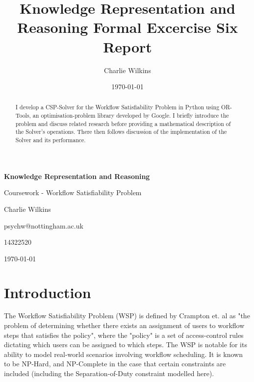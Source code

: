 \documentclass[11pt]{article}
\title{Knowledge Representation and Reasoning Formal Excercise Six Report}
\author{Charlie Wilkins}
\date{\today}
\begin{document}
	\begin{titlepage}
		\begin{center}
			\vspace*{1cm}

       		\textbf{Knowledge Representation and Reasoning}

       		\vspace{0.5cm}

			   Coursework - Workflow Satisfiability Problem

       		\vspace{1.5cm}

       		Charlie Wilkins
			
			\vspace{0.5cm}			
			
       		psychw@nottingham.ac.uk
       		
       		14322520
       		
       		\vspace{0.5cm}
       		
       		\today
		\end{center}
	\end{titlepage}

	\begin{abstract}

		I develop a CSP-Solver for the Workflow Satisfiability Problem in Python
		using OR-Tools, an optimisation-problem library developed by Google. I
		briefly introduce the problem and discuss related research before providing
		a mathematical description of the Solver's operations. There then follows
		discussion of the implementation of the Solver and its performance.

	\end{abstract}

	\newpage

	\tableofcontents

	\newpage

	\section{Introduction}

		The Workflow Satisfiability Problem (WSP) is defined by Crampton et. al\cite{crampton16} as
		"the problem of determining whether there exists an assignment of
		users to workflow steps that satisfies the policy", where the "policy"
		is a set of access-control rules dictating which users can be assigned
		to which steps. The WSP is notable for its ability to model real-world
		scenarios involving workflow scheduling\cite{crampton16}. It is known to be NP-Hard\cite{crampton162}, and NP-Complete in the case that
		certain constraints are included (including the Separation-of-Duty constraint
		modelled here)\cite{wang10}.
\end{document}
